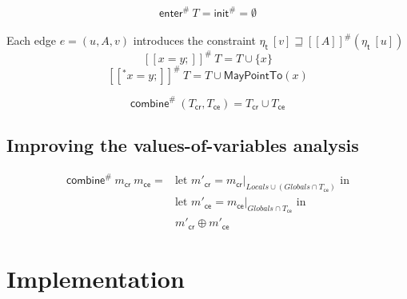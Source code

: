       \[\textsf{enter}^{\#}\ T = \textsf{init}^{\#} = \emptyset\]
      \\
      Each edge $e = (u, A, v)$ introduces the constraint $\eta_\textsf{t}\ [v] \sqsupseteq [\![  A ]\!]^{\#}  (\eta_\textsf{t}\ [u]) $\\
      \[ [\![ x = y; ]\!] ^{\#}\ T =  T \cup \{x\} \]
      \[ [\![ ^*x = y; ]\!] ^{\#}\ T =  T \cup \textsf{MayPointTo}(x) \]

      \[ \textsf{combine}^{\#}\ (T_\textsf{cr}, T_\textsf{ce}) = T_\textsf{cr} \cup T_\textsf{ce} \]

    \subsection{Improving the values-of-variables analysis}
      \begin{align*}
        \textsf{combine}^{\#}\ m_\textsf{cr}\ m_\textsf{ce} = & \text{let } m'_\textsf{cr} = m_\textsf{cr}|_{Locals \cup (Globals \cap T_\textsf{ce})} \text{ in}\\
        & \text{let } m'_\textsf{ce} = m_\textsf{ce}|_{Globals \cap T_\textsf{ce}}\text{ in} \\
        & m'_\textsf{cr} \oplus m'_\textsf{ce}
      \end{align*}

  \section{Implementation}


